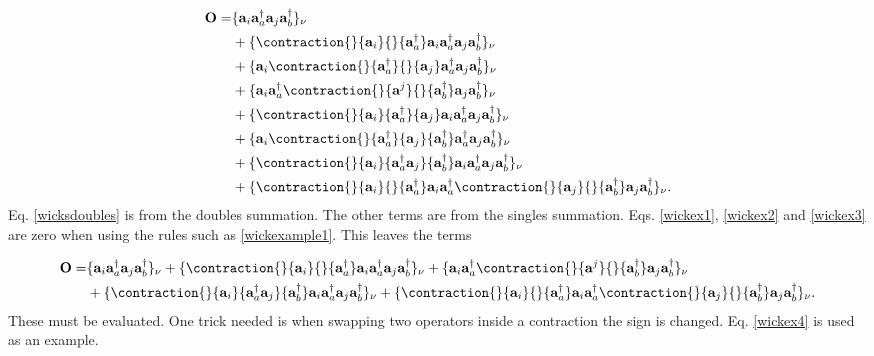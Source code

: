 \begin{align}
\textbf{O} = & 
\{
\textbf{a}_i \textbf{a}^{\dag}_a \textbf{a}_j \textbf{a}^{\dag}_b
\}_{\nu} \\ &
+ \{
\contraction{}{\textbf{a}_i}{}{\textbf{a}^{\dag}_a}
\textbf{a}_i \textbf{a}^{\dag}_a
\textbf{a}_j \textbf{a}^{\dag}_b
\}_{\nu} \\ &
+ \{
\textbf{a}_i
\contraction{}{\textbf{a}^{\dag}_a}{}{\textbf{a}_j}
\textbf{a}^{\dag}_a \textbf{a}_j
\textbf{a}^{\dag}_b
\}_{\nu} \label{wickex1} \\ &
+ \{
\textbf{a}_i \textbf{a}^{\dag}_a
\contraction{}{\textbf{a}^j}{}{\textbf{a}^{\dag}_b}
\textbf{a}_j \textbf{a}^{\dag}_b
\}_{\nu} \\ &
+ \{
\contraction{}{\textbf{a}_i}{\textbf{a}^{\dag}_a}{\textbf{a}_j}
\textbf{a}_i \textbf{a}^{\dag}_a \textbf{a}_j
\textbf{a}^{\dag}_b
\}_{\nu} \label{wickex2} \\ &
+ \{
\textbf{a}_i
\contraction{}{\textbf{a}^{\dag}_a}{\textbf{a}_j}{\textbf{a}^{\dag}_b}
\textbf{a}^{\dag}_a \textbf{a}_j \textbf{a}^{\dag}_b
\}_{\nu} \label{wickex3} \\ &
+ \{
\contraction{}{\textbf{a}_i}{\textbf{a}^{\dag}_a \textbf{a}_j}{\textbf{a}^{\dag}_b}
\textbf{a}_i \textbf{a}^{\dag}_a \textbf{a}_j \textbf{a}^{\dag}_b
\}_{\nu} \label{wickex4} \\ &
+ \{
\contraction{}{\textbf{a}_i}{}{\textbf{a}^{\dag}_a}
\textbf{a}_i \textbf{a}^{\dag}_a 
\contraction{}{\textbf{a}_j}{}{\textbf{a}^{\dag}_b}
\textbf{a}_j \textbf{a}^{\dag}_b
\}_{\nu} . \label{wicksdoubles}
\end{align}
Eq. \eqref{wicksdoubles} is from the doubles summation. The other terms are from the singles summation. Eqs. \eqref{wickex1}, \eqref{wickex2} and \eqref{wickex3} are zero when using the rules such as \eqref{wickexample1}. This leaves the terms

\begin{align}
\textbf{O} = & 
\{
\textbf{a}_i \textbf{a}^{\dag}_a \textbf{a}_j \textbf{a}^{\dag}_b
\}_{\nu}
+ \{
\contraction{}{\textbf{a}_i}{}{\textbf{a}^{\dag}_a}
\textbf{a}_i \textbf{a}^{\dag}_a
\textbf{a}_j \textbf{a}^{\dag}_b
\}_{\nu}
+ \{
\textbf{a}_i \textbf{a}^{\dag}_a
\contraction{}{\textbf{a}^j}{}{\textbf{a}^{\dag}_b}
\textbf{a}_j \textbf{a}^{\dag}_b
\}_{\nu} \nonumber \\ &
+ \{
\contraction{}{\textbf{a}_i}{\textbf{a}^{\dag}_a \textbf{a}_j}{\textbf{a}^{\dag}_b}
\textbf{a}_i \textbf{a}^{\dag}_a \textbf{a}_j \textbf{a}^{\dag}_b
\}_{\nu}
+ \{
\contraction{}{\textbf{a}_i}{}{\textbf{a}^{\dag}_a}
\textbf{a}_i \textbf{a}^{\dag}_a 
\contraction{}{\textbf{a}_j}{}{\textbf{a}^{\dag}_b}
\textbf{a}_j \textbf{a}^{\dag}_b
\}_{\nu} .
\end{align}
These must be evaluated. One trick needed is when swapping two operators inside a contraction the sign is changed. Eq. \eqref{wickex4} is used as an example.

